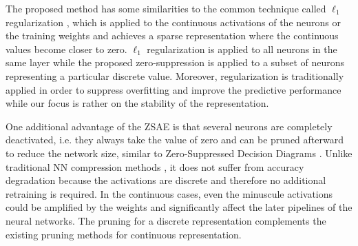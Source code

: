 The proposed method has some similarities to the common technique called $\ell_1$ regularization \cite[Sparse AE]{Goodfellow-et-al-2016},
which is applied to the continuous activations of the neurons or the training weights
and achieves a sparse representation where the continuous values become closer to zero.
$\ell_1$ regularization is applied to all neurons in the same layer
while the proposed zero-suppression is applied to a subset of neurons representing a particular discrete value.
% 
Moreover, regularization is traditionally applied in order to suppress overfitting and improve the predictive performance
while our focus is rather on the stability of the representation.
% 



One additional advantage of the ZSAE is that
several neurons are completely deactivated, i.e. they always take the value of zero
and can be pruned afterward to reduce the network size,
similar to Zero-Suppressed Decision Diagrams \cite{minato1993zero}.
Unlike traditional NN compression methods \cite{cheng2017survey}, it does not suffer from
accuracy degradation because the activations are discrete and therefore no additional retraining is required.
In the continuous cases, even the minuscule activations could be amplified by the weights and significantly affect the
later pipelines of the neural networks.
The pruning for a discrete representation complements the existing pruning methods for continuous representation.

